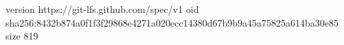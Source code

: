 version https://git-lfs.github.com/spec/v1
oid sha256:8432b874a0f1f3f29868e4271a020ecc14380d67b9b9a45a75825a614ba30e85
size 819
